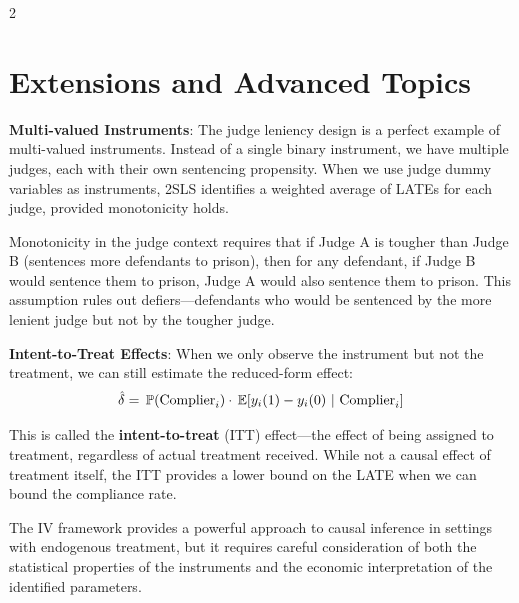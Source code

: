 \documentclass[12pt]{article}
\begin{document}
\begin{multicols}{2}
\section*{Extensions and Advanced Topics}

\textbf{Multi-valued Instruments}: The judge leniency design is a perfect example of multi-valued instruments.
Instead of a single binary instrument, we have multiple judges, each with their own sentencing propensity.
When we use judge dummy variables as instruments, 2SLS identifies a weighted average of LATEs for each judge, provided monotonicity holds.

Monotonicity in the judge context requires that if Judge A is tougher than Judge B (sentences more defendants to prison), then for any defendant, if Judge B would sentence them to prison, Judge A would also sentence them to prison.
This assumption rules out defiers---defendants who would be sentenced by the more lenient judge but not by the tougher judge.

\textbf{Intent-to-Treat Effects}: When we only observe the instrument but not the treatment, we can still estimate the reduced-form effect:
$$
  \hat{\delta} = \prob{\text{Complier}_i} \cdot \expec{y_i(1) - y_i(0)}{\text{Complier}_i}
$$

This is called the \textbf{intent-to-treat} (ITT) effect---the effect of being assigned to treatment, regardless of actual treatment received.
While not a causal effect of treatment itself, the ITT provides a lower bound on the LATE when we can bound the compliance rate.

The IV framework provides a powerful approach to causal inference in settings with endogenous treatment, but it requires careful consideration of both the statistical properties of the instruments and the economic interpretation of the identified parameters.

\end{multicols}
\end{document}

